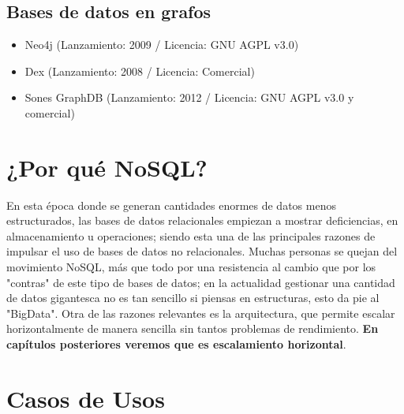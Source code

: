 \subsection*{Bases de datos en grafos}

\begin{itemize}
\item Neo4j (Lanzamiento: 2009 / Licencia: GNU AGPL v3.0)
\item Dex (Lanzamiento: 2008 / Licencia: Comercial)
\item Sones GraphDB (Lanzamiento: 2012 / Licencia: GNU AGPL v3.0 y comercial)
\end{itemize}

\section{¿Por qu\'e NoSQL?}

En esta \'epoca donde se generan cantidades enormes de datos menos estructurados, las bases de datos relacionales empiezan a mostrar deficiencias, en almacenamiento u operaciones; siendo esta una de las principales razones de impulsar el uso de bases de datos no relacionales. Muchas personas se quejan del movimiento NoSQL, m\'as que todo por una resistencia al cambio que por los "contras" de este tipo de bases de datos; en la actualidad gestionar una cantidad de datos gigantesca no es tan sencillo si piensas en estructuras, esto da pie al "BigData". Otra de las razones relevantes es la arquitectura, que permite escalar horizontalmente de manera sencilla sin tantos problemas de rendimiento. \textbf{En cap\'itulos posteriores veremos que es escalamiento horizontal}.

\section{Casos de Usos}

